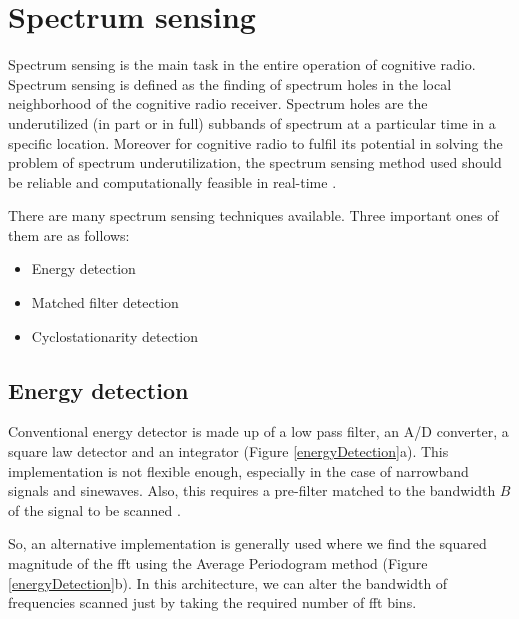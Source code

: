 \chapter{Spectrum sensing}

Spectrum sensing is the main task in the entire operation of cognitive
radio. Spectrum sensing is defined as the finding of spectrum holes in 
the local neighborhood of the cognitive radio receiver. Spectrum holes are the
underutilized (in part or in full) subbands of spectrum at a particular time
in a specific location. Moreover for cognitive radio to fulfil its potential
in solving the problem of spectrum underutilization, the spectrum sensing 
method used should be reliable and computationally feasible in real-time 
\cite{haykin09}.

There are many spectrum sensing techniques available. Three important ones of
them are as follows:
\begin{itemize}
    \item Energy detection
    \item Matched filter detection
    \item Cyclostationarity detection
\end{itemize}

\section{Energy detection}

Conventional energy detector is made up of a low pass filter, an A/D 
converter, a square law detector and an integrator (Figure 
\ref{energyDetection}a). This implementation is not flexible enough, 
especially in the case of narrowband signals and sinewaves. Also, this 
requires a pre-filter matched to the bandwidth $B$ of the signal to be scanned
\cite{cabric06}.

So, an alternative implementation is generally used where we find the squared 
magnitude of the \gls{fft}  using the Average Periodogram method (Figure 
\ref{energyDetection}b). In this architecture, we can alter the bandwidth of
frequencies scanned just by taking
the required number of \gls{fft}  bins. 

